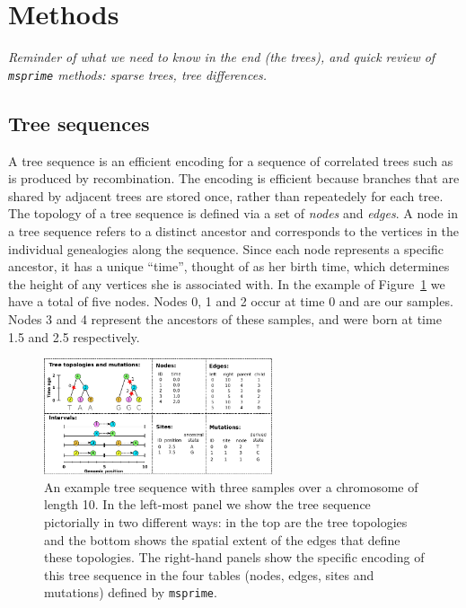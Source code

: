 \documentclass{article}
\newcommand{\msprime}{\texttt{msprime}}
\newcommand{\plr}[1]{{\em \color{blue} #1}}
\begin{document}
\section*{Methods}

\plr{Reminder of what we need to know in the end (the trees), and
    quick review of \msprime{} methods: sparse trees, tree differences.}

\subsection*{Tree sequences}
A tree sequence is an efficient encoding for a sequence of correlated trees such as
is produced by recombination. The encoding is efficient because branches that are
shared by adjacent trees are stored once, rather than repeatedely for each tree.
The topology of a tree sequence is defined via a set of \emph{nodes} and
\emph{edges}. A node in a tree sequence refers to a distinct ancestor and
corresponds to the vertices in the individual genealogies along the sequence.
Since each node represents a specific ancestor, it has a unique ``time'',
thought of as her birth time, which determines the height of any vertices
she is associated with. In the example of Figure~\ref{fig:example_tree_sequence}
we have a total of five nodes. Nodes 0, 1 and 2 occur at time 0 and are our
samples. Nodes 3 and 4 represent the ancestors of these samples, and were born at
time 1.5 and 2.5 respectively.

\begin{figure}
    \begin{center}
        \includegraphics[width=0.6\textwidth]{example_tree_sequence}
    \end{center}
    \caption{
        An example tree sequence with three samples over a chromosome of length 10. In the
        left-most panel we show the tree sequence pictorially in two different ways:
        in the top are the tree topologies and the bottom shows the spatial extent of the
        edges that define these topologies. The right-hand panels show the specific encoding
        of this tree sequence in the four tables (nodes, edges, sites and mutations) defined
        by \msprime.
        \label{fig:example_tree_sequence}
    }
\end{figure}
\end{document}
